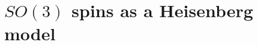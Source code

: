 \documentclass[prb,twocolumn]{revtex4-1}
\begin{document}


\section{$SO(3)$ spins as a Heisenberg model}
\label{section::Heisenberg}
\end{document}
